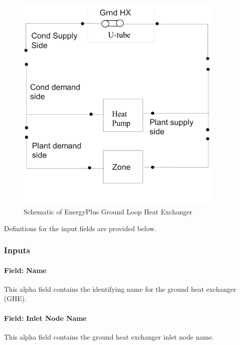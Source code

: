 \begin{figure}[hbtp] %
\centering
\includegraphics[width=0.9\textwidth, height=0.9\textheight, keepaspectratio=true]{media/image202.png}
\caption{Schematic of EnergyPlus Ground Loop Heat Exchanger \protect \label{fig:schematic-of-energyplus-ground-loop-heat}}
\end{figure}

Definitions for the input fields are provided below.

\subsubsection{Inputs}\label{inputs-10-002}

\paragraph{Field: Name}\label{field-name-9-003}

This alpha field contains the identifying name for the ground heat exchanger (GHE).

\paragraph{Field: Inlet Node Name}\label{field-inlet-node-name-000}

This alpha field contains the ground heat exchanger inlet node name.

